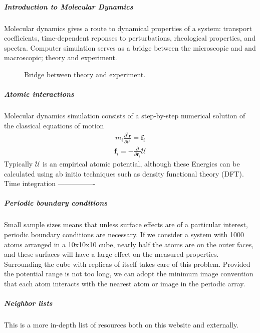 \documentclass[letterpaper,10pt,english]{sphinxmanual}
\begin{document}
\subparagraph{Introduction to Molecular Dynamics}
\label{\detokenize{md/intro_md:introduction-to-molecular-dynamics}}\label{\detokenize{md/intro_md:intro-md}}\label{\detokenize{md/intro_md::doc}}
Molecular dynamics gives a route to dynamical properties of a system: transport coefficients, time-dependent reponses to perturbations, rheological properties, and
spectra.  Computer simulation serves as a bridge between the microscopic and and macroscopic; theory and experiment.

\begin{figure}[htbp]
\centering
\capstart

\noindent{}
\caption{Bridge between theory and experiment.}\label{\detokenize{md/intro_md:id1}}\end{figure}


\subparagraph{Atomic interactions}
\label{\detokenize{md/intro_md:atomic-interactions}}
Molecular dynamics simulation consists of a step-by-step numerical solution of the classical equations of motion
\begin{equation*}
\begin{split}m_i \frac{\partial^2 \mathbf{r}}{\partial t^2}  = \mathbf{f}_i\end{split}
\end{equation*}\begin{equation*}
\begin{split}\mathbf{f}_i = - \frac{\partial}{\partial \mathbf{r}_i} \mathcal{U}\end{split}
\end{equation*}
Typically \(\mathcal{U}\) is an empirical atomic potential, although these Energies can be calculated using ab initio techniques such as density functional theory (DFT).
Time integration
—————-


\subparagraph{Periodic boundary conditions}
\label{\detokenize{md/intro_md:periodic-boundary-conditions}}
Small sample sizes means that unless surface effects are of a particular interest, periodic boundary conditions are necessary.
If we consider a system with 1000 atoms arranged in a 10x10x10 cube, nearly half the atoms are on the outer faces, and these surfaces will have a large effect on the measured properties.
Surrounding the cube with replicas of itself takes care of this problem.  Provided the potential range is not too long, we can adopt the minimum image convention that each atom interacts with the nearest atom or image in the periodic array.


\subparagraph{Neighbor lists}
\label{\detokenize{md/intro_md:neighbor-lists}}
This is a more in-depth list of resources both on this website and externally.
\end{document}
